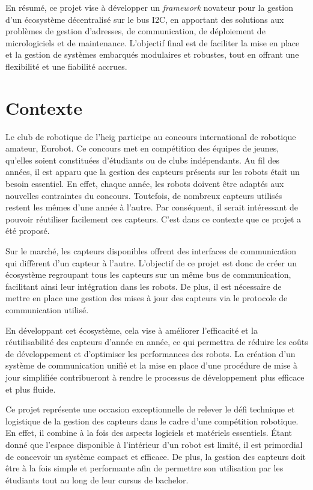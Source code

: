 En résumé, ce projet vise à développer un \textit{\gls{framework}} novateur pour la gestion d'un écosystème décentralisé sur le bus I2C, en apportant des solutions aux problèmes de gestion d'adresses, de communication, de déploiement de micrologiciels et de maintenance.
L'objectif final est de faciliter la mise en place et la gestion de systèmes embarqués modulaires et robustes, tout en offrant une flexibilité et une fiabilité accrues.

\section{Contexte}
Le club de robotique de l'\gls{heig} participe au concours international de robotique amateur, Eurobot.
Ce concours met en compétition des équipes de jeunes, qu'elles soient constituées d'étudiants ou de clubs indépendants.
Au fil des années, il est apparu que la gestion des capteurs présents sur les robots était un besoin essentiel.
En effet, chaque année, les robots doivent être adaptés aux nouvelles contraintes du concours.
Toutefois, de nombreux capteurs utilisés restent les mêmes d'une année à l'autre.
Par conséquent, il serait intéressant de pouvoir réutiliser facilement ces capteurs.
C'est dans ce contexte que ce projet a été proposé.

Sur le marché, les capteurs disponibles offrent des interfaces de communication qui diffèrent d'un capteur à l'autre.
L'objectif de ce projet est donc de créer un écosystème regroupant tous les capteurs sur un même bus de communication, facilitant ainsi leur intégration dans les robots.
De plus, il est nécessaire de mettre en place une gestion des mises à jour des capteurs via le protocole de communication utilisé.

En développant cet écosystème, cela vise à améliorer l'efficacité et la réutilisabilité des capteurs d'année en année, ce qui permettra de réduire les coûts de développement et d'optimiser les performances des robots.
La création d'un système de communication unifié et la mise en place d'une procédure de mise à jour simplifiée contribueront à rendre le processus de développement plus efficace et plus fluide.

Ce projet représente une occasion exceptionnelle de relever le défi technique et logistique de la gestion des capteurs dans le cadre d'une compétition robotique.
En effet, il combine à la fois des aspects logiciels et matériels essentiels.
Étant donné que l'espace disponible à l'intérieur d'un robot est limité, il est primordial de concevoir un système compact et efficace.
De plus, la gestion des capteurs doit être à la fois simple et performante afin de permettre son utilisation par les étudiants tout au long de leur cursus de bachelor.
